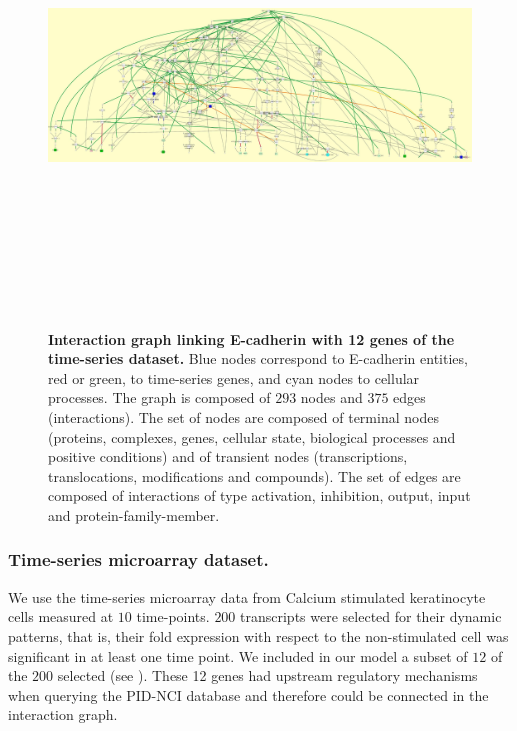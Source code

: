 \begin{figure}[!p]
 \centering
 \includegraphics[width=7.5in, height=5in, angle=-90]{images/net.jpg}
\caption{{\bf  Interaction graph linking E-cadherin with 12 genes of the time-series dataset.} Blue nodes correspond to E-cadherin entities, red or green, to time-series genes, 
and cyan nodes to cellular processes. The graph is composed of $293$ nodes and $375$ edges (interactions).
The set of nodes are composed of terminal nodes (proteins, complexes, genes, cellular state, biological processes and positive conditions) and of transient
nodes (transcriptions, translocations, modifications and compounds). The set of edges are composed of interactions of type activation, inhibition, output, 
input and protein-family-member.} 
 \label{fig:network}
\end{figure}

\subsubsection{Time-series microarray dataset.}
\label{SECTSD}
We use the time-series microarray data from Calcium stimulated keratinocyte cells 
 measured at $10$ time-points. $200$ transcripts were selected for their dynamic patterns,
that is, their fold expression with respect to the non-stimulated cell was significant in at least one time point. 
We included in our model a subset of $12$ of the $200$ selected (see ).  
These 12 genes had upstream regulatory mechanisms when querying the 
PID-NCI database and therefore could be connected in the interaction graph.

